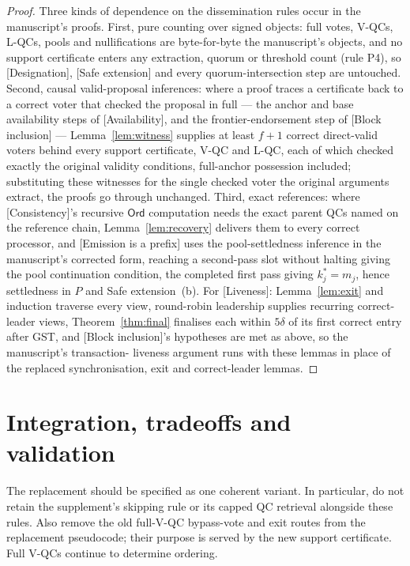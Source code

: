 \documentclass[11pt,a4paper]{article}
\theoremstyle{definition}
\newcommand{\Ord}{\mathsf{Ord}}
\begin{document}
\begin{proof}
Three kinds of dependence on the dissemination rules occur in the
manuscript's proofs. First, pure counting over signed objects:
full votes, V-QCs, L-QCs, pools and nullifications are
byte-for-byte the manuscript's objects, and no support
certificate enters any extraction, quorum or threshold count
(rule P4), so [Designation], [Safe extension] and every
quorum-intersection step are untouched. Second, causal
valid-proposal inferences: where a proof traces a certificate
back to a correct voter that checked the proposal in full --- the
anchor and base availability steps of [Availability], and the
frontier-endorsement step of [Block inclusion] ---
Lemma~\ref{lem:witness} supplies at least $f+1$ correct
direct-valid voters behind every support certificate, V-QC and
L-QC, each of which checked exactly the original validity
conditions, full-anchor possession included; substituting these
witnesses for the single checked voter the original arguments
extract, the proofs go through unchanged. Third, exact
references: where [Consistency]'s recursive $\Ord$ computation
needs the exact parent QCs named on the reference chain,
Lemma~\ref{lem:recovery} delivers them to every correct
processor, and [Emission is a prefix] uses the pool-settledness
inference in the manuscript's corrected form, reaching a
second-pass slot without halting giving the pool continuation
condition, the completed first pass giving $k^*_j=m_j$, hence
settledness in $P$ and Safe extension~(b). For [Liveness]:
Lemma~\ref{lem:exit} and induction traverse every view,
round-robin leadership supplies recurring correct-leader views,
Theorem~\ref{thm:final} finalises each within $5\delta$ of its
first correct entry after GST, and [Block inclusion]'s
hypotheses are met as above, so the manuscript's transaction-%
liveness argument runs with these lemmas in place of the
replaced synchronisation, exit and correct-leader lemmas.
\end{proof}

\section{Integration, tradeoffs and validation}

The replacement should be specified as one coherent variant. In particular,
do not retain the supplement's skipping rule or its capped QC retrieval
alongside these rules. Also remove the old full-V-QC bypass-vote and exit
routes from the replacement pseudocode; their purpose is served by the
new support certificate. Full V-QCs continue to determine ordering.
\end{document}
